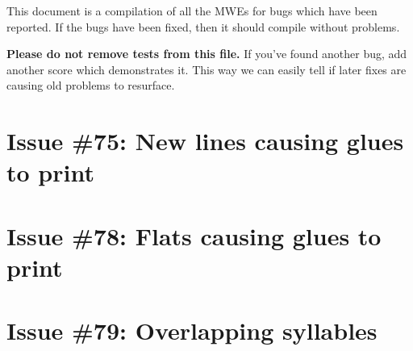 \documentclass[11pt]{article}
\begin{document}
This document is a compilation of all the MWEs for bugs which have been reported.  If the bugs have been fixed, then it should compile without problems.

\textbf{Please do not remove tests from this file.}  If you've found another bug, add another score which demonstrates it.  This way we can easily tell if later fixes are causing old problems to resurface.

\section{Issue \#75: New lines causing glues to print}




\section{Issue \#78: Flats causing glues to print}

\section{Issue \#79: Overlapping syllables}
\end{document}
